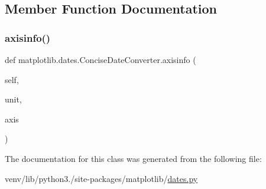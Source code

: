 \subsection{Member Function Documentation}
\mbox{\label{classmatplotlib_1_1dates_1_1ConciseDateConverter_a8cb103029848b37103ff22ac51bb3b04}} 
\subsubsection{\texorpdfstring{axisinfo()}{axisinfo()}}
{\footnotesize\ttfamily def matplotlib.\+dates.\+Concise\+Date\+Converter.\+axisinfo (\begin{DoxyParamCaption}\item[{}]{self,  }\item[{}]{unit,  }\item[{}]{axis }\end{DoxyParamCaption})}



The documentation for this class was generated from the following file\+:\begin{DoxyCompactItemize}
\item 
venv/lib/python3./site-\/packages/matplotlib/\hyperlink{dates_8py}{dates.\+py}\end{DoxyCompactItemize}
